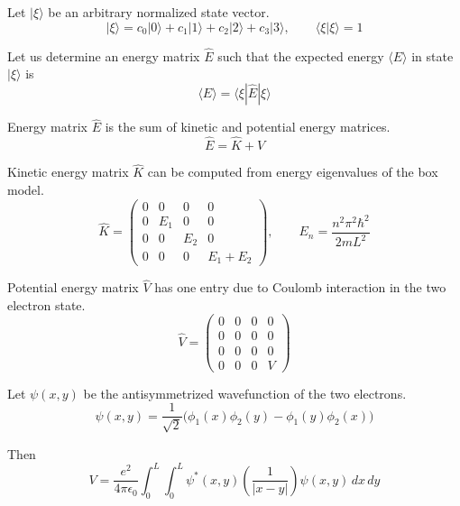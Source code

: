 \documentclass[12pt]{article}
\begin{document}
\noindent
Let $|\xi\rangle$ be an arbitrary normalized state vector.
\begin{equation*}
|\xi\rangle=c_0|0\rangle+c_1|1\rangle+c_2|2\rangle+c_3|3\rangle,\qquad\langle\xi|\xi\rangle=1
\end{equation*}

\noindent
Let us determine an energy matrix $\hat{E}$ such that the expected
energy $\langle E \rangle$ in state $|\xi\rangle$ is
\begin{equation*}
\langle E\rangle=\langle\xi|\hat{E}|\xi\rangle
\end{equation*}

\noindent
Energy matrix $\hat{E}$ is the sum of kinetic and potential energy matrices.
\begin{equation*}
\hat{E}=\hat{K}+\hat{V}
\end{equation*}

\noindent
Kinetic energy matrix $\hat{K}$ can be computed from energy eigenvalues of the box model.
\begin{equation*}
\hat{K}=\begin{pmatrix}
0 & 0 & 0 & 0\\
0 & E_1 & 0 & 0\\
0 & 0 & E_2 & 0\\
0 & 0 & 0 & E_1+E_2
\end{pmatrix},
\qquad
E_n=\frac{n^2\pi^2\hbar^2}{2mL^2}
\end{equation*}

\noindent
Potential energy matrix $\hat{V}$ has one entry due to Coulomb interaction in the two electron state.
\begin{equation*}
\hat{V}=
\begin{pmatrix}
0 & 0 & 0 & 0\\
0 & 0 & 0 & 0\\
0 & 0 & 0 & 0\\
0 & 0 & 0 & V
\end{pmatrix}
\end{equation*}

\noindent
Let $\psi(x,y)$ be the antisymmetrized wavefunction of the two electrons.
\begin{equation*}
\psi(x,y)=\frac{1}{\sqrt{2}}\big(\phi_1(x)\phi_2(y)-\phi_1(y)\phi_2(x)\big)
\end{equation*}

\noindent
Then
\begin{equation*}
V=\frac{e^2}{4\pi\epsilon_0}\int_0^L\int_0^L
\psi^*(x,y)\left(\frac{1}{|x-y|}\right)\psi(x,y)\,dx\,dy
\end{equation*}
\end{document}
